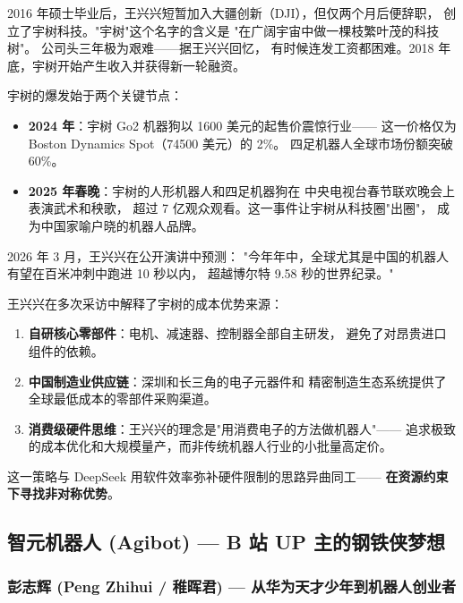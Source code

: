 2016 年硕士毕业后，王兴兴短暂加入大疆创新（DJI），但仅两个月后便辞职，
创立了宇树科技。"宇树"这个名字的含义是
"在广阔宇宙中做一棵枝繁叶茂的科技树"。
公司头三年极为艰难——据王兴兴回忆，
有时候连发工资都困难。2018 年底，宇树开始产生收入并获得新一轮融资。

宇树的爆发始于两个关键节点：
\begin{itemize}[noitemsep]
  \item \textbf{2024 年}：宇树 Go2 机器狗以 1600 美元的起售价震惊行业——
        这一价格仅为 Boston Dynamics Spot（74500 美元）的 2\%。
        四足机器人全球市场份额突破 60\%。
  \item \textbf{2025 年春晚}：宇树的人形机器人和四足机器狗在
        中央电视台春节联欢晚会上表演武术和秧歌，
        超过 7 亿观众观看。这一事件让宇树从科技圈"出圈"，
        成为中国家喻户晓的机器人品牌。
\end{itemize}

2026 年 3 月，王兴兴在公开演讲中预测：
"今年年中，全球尤其是中国的机器人有望在百米冲刺中跑进 10 秒以内，
超越博尔特 9.58 秒的世界纪录。"

\begin{whybox}
王兴兴在多次采访中解释了宇树的成本优势来源：
\begin{enumerate}[noitemsep]
  \item \textbf{自研核心零部件}：电机、减速器、控制器全部自主研发，
        避免了对昂贵进口组件的依赖。
  \item \textbf{中国制造业供应链}：深圳和长三角的电子元器件和
        精密制造生态系统提供了全球最低成本的零部件采购渠道。
  \item \textbf{消费级硬件思维}：王兴兴的理念是"用消费电子的方法做机器人"——
        追求极致的成本优化和大规模量产，而非传统机器人行业的小批量高定价。
\end{enumerate}
这一策略与 DeepSeek 用软件效率弥补硬件限制的思路异曲同工——
\textbf{在资源约束下寻找非对称优势}。
\end{whybox}


\subsection{智元机器人 (Agibot) — B 站 UP 主的钢铁侠梦想}

\subsubsection{彭志辉 (Peng Zhihui / 稚晖君) — 从华为天才少年到机器人创业者}

